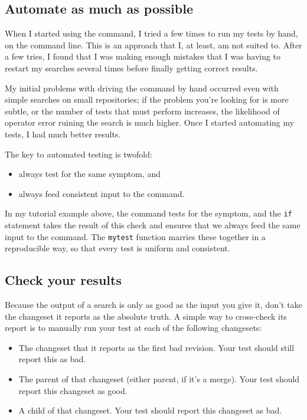 \subsection{Automate as much as possible}

When I started using the  command, I tried a few times
to run my tests by hand, on the command line.  This is an approach
that I, at least, am not suited to.  After a few tries, I found that I
was making enough mistakes that I was having to restart my searches
several times before finally getting correct results.

My initial problems with driving the  command by hand
occurred even with simple searches on small repositories; if the
problem you're looking for is more subtle, or the number of tests that
 must perform increases, the likelihood of operator
error ruining the search is much higher.  Once I started automating my
tests, I had much better results.

The key to automated testing is twofold:
\begin{itemize}
\item always test for the same symptom, and
\item always feed consistent input to the  command.
\end{itemize}
In my tutorial example above, the  command tests for the
symptom, and the \texttt{if} statement takes the result of this check
and ensures that we always feed the same input to the 
command.  The \texttt{mytest} function marries these together in a
reproducible way, so that every test is uniform and consistent.

\subsection{Check your results}

Because the output of a  search is only as good as the
input you give it, don't take the changeset it reports as the
absolute truth.  A simple way to cross-check its report is to manually
run your test at each of the following changesets:
\begin{itemize}
\item The changeset that it reports as the first bad revision.  Your
  test should still report this as bad.
\item The parent of that changeset (either parent, if it's a merge).
  Your test should report this changeset as good.
\item A child of that changeset.  Your test should report this
  changeset as bad.
\end{itemize}

